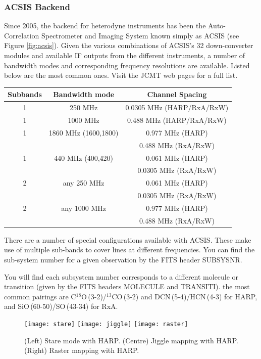 \documentclass[twoside,11pt]{article}
\renewcommand{\_}{\texttt{\symbol{95}}}
\begin{document}
\subsubsection{ACSIS Backend}
Since 2005, the backend for heterodyne instruments has been the Auto-Correlation Spectrometer and Imaging System known simply as ACSIS (see Figure \ref{fig:acsis}). Given the various combinations of ACSIS's 32 down-converter modules and available IF outputs from the different instruments, a number of bandwidth modes and corresponding frequency resolutions are available. Listed below are the most common ones. Visit the JCMT web pages for a full list.
\newpage
\begin{table}[h!]
\begin{center}
\begin{tabular}{c|c|c}
\hline
\textbf{Subbands} & \textbf{Bandwidth mode}&	\textbf{Channel Spacing}\\
\hline
1 & 250 MHz &	0.0305 MHz (HARP/RxA/RxW)\\
1 &1000 MHz&	0.488 MHz (HARP/RxA/RxW)\\
1 &1860 MHz (1600,1800) &	0.977 MHz (HARP) \\
 & & 0.488 MHz (RxA/RxW)\\
1 &440  MHz (400,420) &	0.061 MHz (HARP) \\
 & &	 0.0305 MHz (RxA/RxW)\\
\hline
2  & any 250 MHz&	0.061 MHz (HARP)\\
  &&	 0.0305 MHz (RxA/RxW)\\
2 &any 1000 MHz&	0.977 MHz (HARP) \\
 && 0.488 MHz (RxA/RxW)\\
\hline
\end{tabular}
\end{center}
\end{table}
There are a number of special configurations available with ACSIS. These make use of multiple sub-bands to cover lines at different frequencies.  You can find the sub-system number for a given observation by the FITS header SUBSYSNR. 

You will find each subsystem number corresponds to a different molecule or transition (given by the FITS headers MOLECULE and TRANSITI). the most common pairings are C$^{18}$O\,(3-2)/$^{13}$CO\,(3-2) and DCN\,(5-4)/HCN\,(4-3)  for HARP, and SiO\,(60-50)/SO\,(43-34) for RxA.

\begin{figure}[t!]
\begin{center}
\texttt{[image: stare]}
\texttt{[image: jiggle]}
\texttt{[image: raster]}
\caption[Stare, jiggle and raster observing modes]{(Left) Stare mode with HARP. (Centre) Jiggle mapping with HARP. (Right) Raster mapping with HARP.}
\label{fig:harpmodes}
\end{center}
\end{figure}
\end{document}
